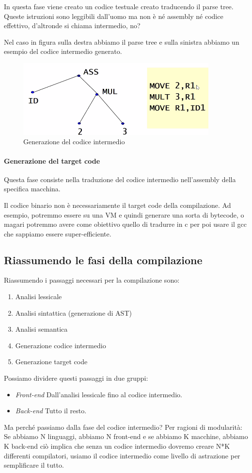 \documentclass[class=book, crop=false, oneside]{standalone}
\begin{document}
In questa fase viene creato un codice testuale creato traducendo il parse tree. Queste istruzioni sono leggibili dall’uomo ma non è né assembly né codice effettivo, d’altronde si chiama intermedio, no?

Nel caso in figura sulla destra abbiamo il parse tree e sulla sinistra abbiamo un esempio del codice intermedio generato.
\begin{figure}[H]
	\centering
	\includegraphics[width=0.9\textwidth,keepaspectratio]{codice_intermedio}
	\caption{Generazione del codice intermedio}
\end{figure}

\paragraph{Generazione del target code}
Questa fase consiste nella traduzione del codice intermedio nell’assembly della specifica macchina.

Il codice binario non è necessariamente il target code della compilazione. Ad esempio, potremmo essere su una VM e quindi generare una sorta di bytecode, o magari potremmo avere come obiettivo quello di tradurre in c per poi usare il gcc che sappiamo essere super-efficiente.


\subsection{Riassumendo le fasi della compilazione}
Riassumendo i passaggi necessari per la compilazione sono:
\begin{enumerate}
    \item Analisi lessicale
    \item Analisi sintattica (generazione di AST)
    \item Analisi semantica
    \item Generazione codice intermedio
    \item Generazione target code
\end{enumerate}
Possiamo dividere questi passaggi in due gruppi:
\begin{itemize}[]
    \item \emph{Front-end} Dall’analisi lessicale fino al codice intermedio.
    \item \emph{Back-end} Tutto il resto.
\end{itemize}

Ma perché passiamo dalla fase del codice intermedio? Per ragioni di modularità:
Se abbiamo N linguaggi, abbiamo N front-end e se abbiamo K macchine, abbiamo K back-end ciò implica che senza un codice intermedio dovremo creare N*K differenti compilatori, usiamo il codice intermedio come livello di astrazione per semplificare il tutto. 
\end{document}
